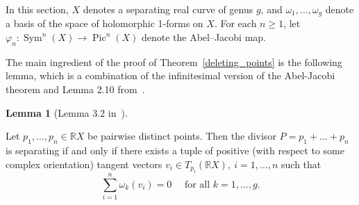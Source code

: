 \documentclass[x11names,oneside,11pt]{amsart}
\theoremstyle{definition}
\newtheorem{corollary}{Corollary}
\newtheorem{lemma}{Lemma}
\theoremstyle{remark}
\DeclareMathOperator{\Sym}{Sym}
\DeclareMathOperator{\Pic}{Pic}
\newcommand{\R}{\mathbb{R}}
\newcommand{\PP}{\mathbb{P}}
\begin{document}

  In this section, $X$ denotes a separating real curve of genus $g$, and $\omega_1, \ldots, \omega_g$ denote a basis of the space of holomorphic 1-forms on $X$. For each $n\geqslant1$, let $\varphi_n\colon\Sym^n(X)\to\Pic^n(X)$ denote the Abel--Jacobi map.
  
  The main ingredient of the proof of Theorem~\ref{deleting_points} is the following lemma, which is a combination of the infinitesimal version of the Abel-Jacobi theorem and Lemma 2.10 from~\cite{kummer_separating_2020}.  


   \begin{lemma}[Lemma 3.2 in~\cite{orevkov_separating_2019}]\label{abel-jacobi_lemma}

   Let $p_1, \ldots, p_n \in \R X$ be pairwise distinct points. Then the divisor $P = p_1 + \ldots + p_n$ is separating if and only if there exists a tuple of positive (with respect to some complex orientation) tangent vectors $v_i \in T_{p_i}(\R X), \ i = 1, \ldots, n $  such that 
   \begin{equation}\tag{$\dagger$} 
       \sum_{i=1}^{n}\omega_k(v_i) = 0 \quad \text{ for all } k = 1, \ldots, g.  \label{abel_jacobi_lemma_eq}
    \end{equation}
  \end{lemma}
\end{document}
